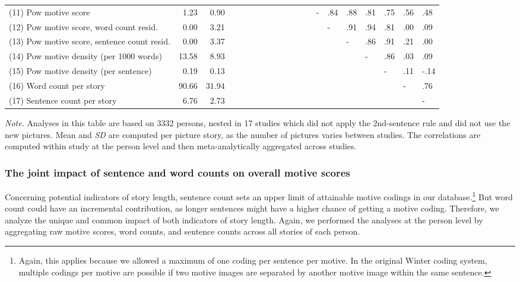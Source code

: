 \documentclass[man,a4paper,mask]{apa6}\usepackage[]{graphicx}\usepackage[]{color}
\begin{document}
\begin{table}
\begin{threeparttable}
\begin{tabularx}{\textwidth}{Xrrlllllllllllllllll}
  (11) Pow motive score & 1.23 & 0.90 &  &  &  &  &  &  &  &  &  &  & - & .84 & .88 & .81 & .75 & .56 & .48 \\ 
  (12) Pow motive score, word count resid. & 0.00 & 3.21 &  &  &  &  &  &  &  &  &  &  &  & - & .91 & .94 & .81 & .00 & .09 \\ 
  (13) Pow motive score, sentence count resid. & 0.00 & 3.37 &  &  &  &  &  &  &  &  &  &  &  &  & - & .86 & .91 & .21 & .00 \\ 
  (14) Pow motive density (per 1000 words) & 13.58 & 8.93 &  &  &  &  &  &  &  &  &  &  &  &  &  & - & .86 & .03 & .09 \\ 
  (15) Pow motive density (per sentence) & 0.19 & 0.13 &  &  &  &  &  &  &  &  &  &  &  &  &  &  & - & .11 & -.14 \\ 
  (16) Word count per story & 90.66 & 31.94 &  &  &  &  &  &  &  &  &  &  &  &  &  &  &  & - & .76 \\ 
  (17) Sentence count per story & 6.76 & 2.73 &  &  &  &  &  &  &  &  &  &  &  &  &  &  &  &  & - \\ 
   \hline

		\bottomrule
		\end{tabularx}
		\begin{tablenotes}[para,flushleft]
			{\small
			\vspace*{0.75em}
			\textit{Note.} Analyses in this table are based on 3332 persons, nested in 17 studies which did not apply the 2nd-sentence rule and did not use the new pictures. Mean and \emph{SD} are computed per picture story, as the number of pictures varies between studies. The correlations are computed within study at the person level and then meta-analytically aggregated across studies.}
	      \end{tablenotes}
	  \end{threeparttable}
\end{table}


\subsubsection{The joint impact of sentence and word counts on overall motive scores}
Concerning potential indicators of story length, sentence count sets an upper limit of attainable motive codings in our database.\footnote{Again, this applies because we allowed a maximum of one coding per sentence per motive. In the original Winter coding system, multiple codings per motive are possible if two motive images are separated by another motive image within the same sentence.} But word count could have an incremental contribution, as longer sentences might have a higher chance of getting a motive coding. Therefore, we analyze the unique and common impact of both indicators of story length. Again, we performed the analyses at the person level by aggregating raw motive scores, word counts, and sentence counts across all stories of each person.
\end{document}
